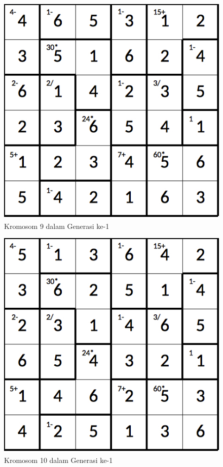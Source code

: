 \documentclass[a4paper,twoside]{article}
\begin{document}
\begin{enumerate}
\begin{figure}
\centering
\captionsetup{justification=centering}
\includegraphics[scale=0.333]{Gambar/hybridgenetic/Generation1Chromosome9}
\caption[Kromosom 9 dalam Generasi ke-1]{Kromosom 9 dalam Generasi ke-1}
\label{fig:analisisg1k9}
\end{figure}

\begin{figure}
\centering
\captionsetup{justification=centering}
\includegraphics[scale=0.333]{Gambar/hybridgenetic/Generation1Chromosome10}
\caption[Kromosom 10 dalam Generasi ke-1]{Kromosom 10 dalam Generasi ke-1}
\label{fig:analisisg1k10}
\end{figure}


\end{enumerate}
\end{document}
